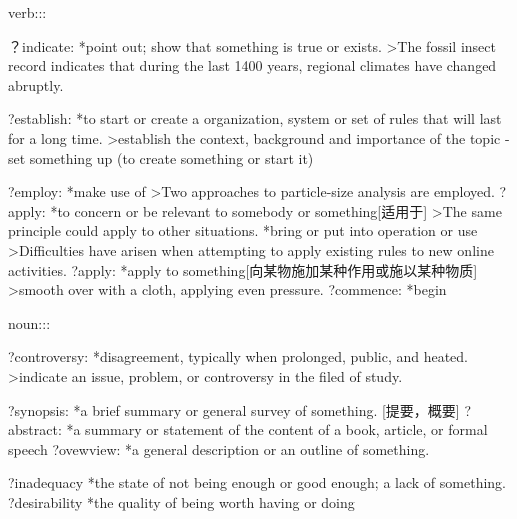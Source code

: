 \documentclass{book}
\begin{document}
verb:::

？indicate:
*point out; show that something is true or exists.
>The fossil insect record indicates that during the last 1400 years, regional climates have changed abruptly.

?establish: 
*to start or create a organization, system or set of rules that will last for a long time.
>establish the context, background and importance of the topic
- set something up (to create something or start it)

?employ:
*make use of
>Two approaches to particle-size analysis are employed.
?apply:
*to concern or be relevant to somebody or something[适用于]
>The same principle could apply to other situations.
*bring or put into operation or use
>Difficulties have arisen when attempting to apply existing rules to new online activities.
?apply:
*apply to something[向某物施加某种作用或施以某种物质]
>smooth over with a cloth, applying even pressure.
?commence:
*begin

noun:::

?controversy:
*disagreement, typically when prolonged, public, and heated.
>indicate an issue, problem, or controversy in the filed of study.

?synopsis:
*a brief summary or general survey of something. [提要，概要]
?abstract:
*a summary or statement of the content of a book, article, or formal speech
?ovewview:
*a general description or an outline of something.

?inadequacy
*the state of not being enough or good enough; a lack of something.
?desirability
*the quality of being worth having or doing
\end{document}
